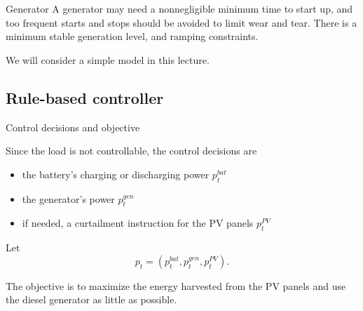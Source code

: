 \begin{frame}{Generator}
 A generator may need a nonnegligible minimum time to start up, and too frequent starts and stops should be avoided to limit wear and tear.
 There is a minimum stable generation level, and ramping constraints.

 We will consider a simple model in this lecture.
\end{frame}




\subsection{Rule-based controller}

\begin{frame}{Control decisions and objective}

Since the load is not controllable, the \alert{control decisions} are 
\begin{itemize}
    \item the battery's charging or discharging power $p^{bat}_t$
    \item the generator's power $p^{gen}_t$
    \item if needed, a curtailment instruction for the PV panels $p^{PV}_t$
\end{itemize}
Let $$p_t = (p^{bat}_t, p^{gen}_t, p^{PV}_t).$$


The \alert{objective} is to maximize the energy harvested from the PV panels and use the diesel generator as little as possible. 

\end{frame}

